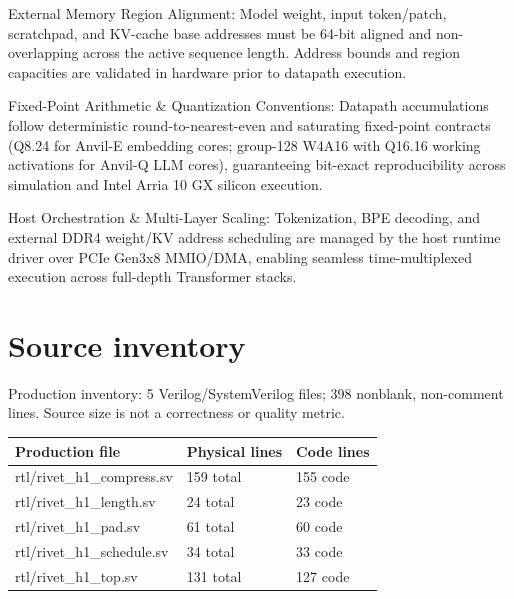 \documentclass[11pt,a4paper]{article}
\begin{document}
External Memory Region Alignment: Model weight,\allowbreak{} input token/\allowbreak{}patch,\allowbreak{} scratchpad,\allowbreak{} and KV-cache base addresses must be 64-bit aligned and non-overlapping across the active sequence length. Address bounds and region capacities are validated in hardware prior to datapath execution.


Fixed-Point Arithmetic \& Quantization Conventions: Datapath accumulations follow deterministic round-to-nearest-even and saturating fixed-point contracts (\allowbreak{}Q8.24 for Anvil-E embedding cores; group-128 W4A16 with Q16.16 working activations for Anvil-Q LLM cores)\allowbreak{},\allowbreak{} guaranteeing bit-exact reproducibility across simulation and Intel Arria 10 GX silicon execution.


Host Orchestration \& Multi-Layer Scaling: Tokenization,\allowbreak{} BPE decoding,\allowbreak{} and external DDR4 weight/\allowbreak{}KV address scheduling are managed by the host runtime driver over PCIe Gen3x8 MMIO/\allowbreak{}DMA,\allowbreak{} enabling seamless time-multiplexed execution across full-depth Transformer stacks.


\appendix{}\section{Source inventory}

Production inventory: 5 Verilog/\allowbreak{}SystemVerilog files; 398 nonblank,\allowbreak{} non-comment lines. Source size is not a correctness or quality metric.

{\small\renewcommand{\arraystretch}{1.18}\begin{longtable}{@{}L{0.55\textwidth}|L{0.18\textwidth}|L{0.18\textwidth}@{}}\toprule

\textbf{Production file} & \textbf{Physical lines} & \textbf{Code lines}\\\midrule\endhead

rtl/\allowbreak{}rivet\_\allowbreak{}h1\_\allowbreak{}compress.sv & 159 total & 155 code\\[2pt]\hline

rtl/\allowbreak{}rivet\_\allowbreak{}h1\_\allowbreak{}length.sv & 24 total & 23 code\\[2pt]\hline

rtl/\allowbreak{}rivet\_\allowbreak{}h1\_\allowbreak{}pad.sv & 61 total & 60 code\\[2pt]\hline

rtl/\allowbreak{}rivet\_\allowbreak{}h1\_\allowbreak{}schedule.sv & 34 total & 33 code\\[2pt]\hline

rtl/\allowbreak{}rivet\_\allowbreak{}h1\_\allowbreak{}top.sv & 131 total & 127 code\\[2pt]\hline

\bottomrule\end{longtable}}
\end{document}
